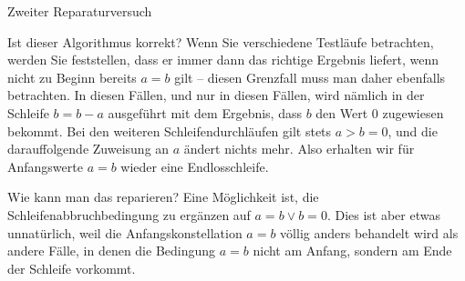 \begin{algorithm}[H]
	\caption{Zweiter Reparaturversuch}
	\label{algo:zweiter_reparaturversuch}
	
	\vspace{2mm} %
	\vspace{\baselineskip}
	
	
	\vspace{2mm} %
	\vspace{\baselineskip}
	

	\vspace{2mm} %
	\vspace{\baselineskip}

	
	\vspace{2mm} %
	\vspace{\baselineskip}
\end{algorithm}

\vspace{\baselineskip} %
\vspace{\baselineskip} %

\vspace{3.7mm} %

Ist dieser Algorithmus korrekt? Wenn Sie verschiedene Testläufe betrachten, werden Sie feststellen, dass er immer dann das richtige Ergebnis liefert, wenn nicht zu Beginn bereits $a=b$ gilt -- diesen Grenzfall muss man daher ebenfalls betrachten. In diesen Fällen, und nur in diesen Fällen, wird nämlich in der Schleife $b=b-a$ ausgeführt mit dem Ergebnis, dass $b$ den Wert 0 zugewiesen bekommt. Bei den weiteren Schleifen\-durchläufen gilt stets $a>b=0$, und die darauffolgende Zuweisung an $a$ ändert nichts mehr. Also erhalten wir für Anfangswerte $a=b$ wieder eine Endlosschleife.

\vspace{3mm} %

Wie kann man das reparieren? Eine Möglichkeit ist, die Schleifenabbruchbedingung zu ergänzen auf $a=b \vee b=0$. Dies ist aber etwas unnatürlich, weil die Anfangs\-konstellation $a=b$ völlig anders behandelt wird als andere Fälle, in denen die Bedingung $a=b$ nicht am Anfang, sondern am Ende der Schleife vorkommt. 

